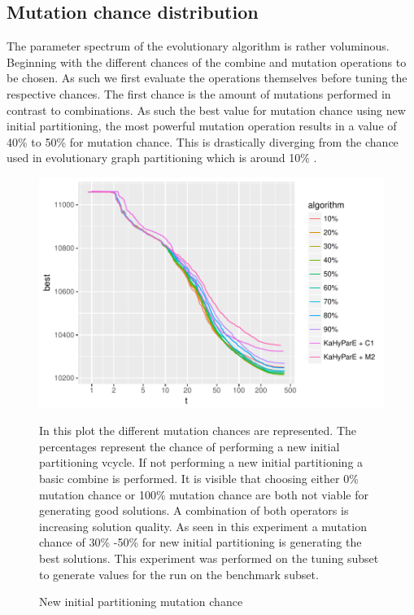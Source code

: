 \documentclass[a4paper,12pt,titlepage, BCOR7mm,headsepline]{scrbook}
\numberwithin{equation}{section}
\begin{document}
\subsection{Mutation chance distribution}
The parameter spectrum of the evolutionary algorithm is rather voluminous. Beginning with the different chances of the combine and mutation operations to be chosen. As such we first evaluate the operations themselves before tuning the respective chances. The first chance is the amount of mutations performed in contrast to combinations. As such the best value for mutation chance using new initial partitioning, the most powerful mutation operation results in a value of 40\% to 50\% for mutation chance. This is drastically diverging from the chance used in evolutionary graph partitioning which is around 10\% \cite{sanders2012distributed}. 
\begin{figure}[H]
\caption{New initial partitioning mutation chance}
\begin{center}
\includegraphics{bachelorarbeit-newipmutationchance}
\end{center}
In this plot the different mutation chances are represented. The percentages represent the chance of performing a new initial partitioning vcycle. If not performing a new initial partitioning a basic combine is performed. It is visible that choosing either 0\% mutation chance or 100\% mutation chance are both not viable for generating good solutions. A combination of both operators is increasing solution quality. As seen in this experiment a mutation chance of 30\% -50\% for new initial partitioning is generating the best solutions. This experiment was performed on the tuning subset to generate values for the run on the benchmark subset.
\end{figure}
\end{document}
